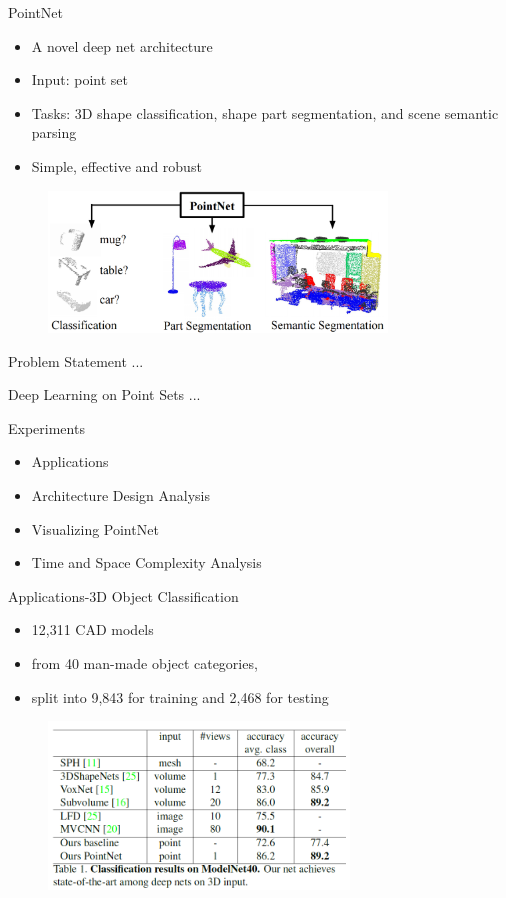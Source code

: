 \documentclass[serif,mathserif]{beamer}
\begin{document}
\begin{frame}{PointNet}
	\begin{itemize}
		\item A novel deep net architecture
		\item Input: point set
		\item Tasks: 3D shape classification, shape part segmentation, and scene semantic parsing 
		\item Simple, effective and robust
	\end{itemize}
	\begin{figure}
		\includegraphics[width=9cm]{image/teaser.png}
	\end{figure}
\end{frame}

\begin{frame}{Problem Statement}
	...
\end{frame}

\begin{frame}{Deep Learning on Point Sets}
	...
\end{frame}

\begin{frame}{Experiments}
	\begin{itemize}
		\item Applications
		\item Architecture Design Analysis
		\item Visualizing PointNet
		\item Time and Space Complexity Analysis
	\end{itemize}
\end{frame}

\begin{frame}{Applications-3D Object Classification}
	\begin{itemize}
		\item 12,311 CAD models
		\item from 40 man-made object categories, 
		\item split into 9,843 for training and 2,468 for testing
	\end{itemize}
	\begin{figure}
		\includegraphics[width=8cm]{image/application.png}
	\end{figure}
\end{frame}
\end{document}
